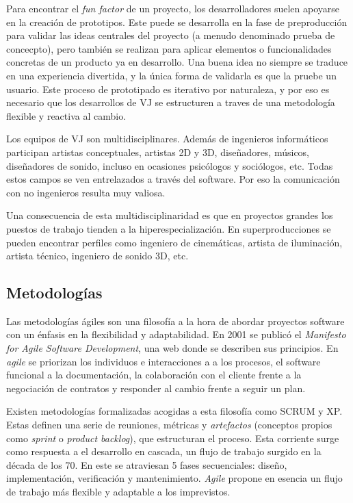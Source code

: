 Para encontrar el \textit{fun factor} de un proyecto, los desarrolladores suelen apoyarse en la creación de prototipos. Este puede se desarrolla en la fase de preproducción para validar las ideas centrales del proyecto (a menudo denominado prueba de concecpto), pero también se realizan para aplicar elementos o funcionalidades concretas de un producto ya en desarrollo. Una buena idea no siempre se traduce en una experiencia divertida, y la única forma de validarla es que la pruebe un usuario. Este proceso de prototipado es iterativo por naturaleza, y por eso es necesario que los desarrollos de VJ se estructuren a traves de una metodología flexible y reactiva al cambio. 

Los equipos de VJ son multidisciplinares. Además de ingenieros informáticos participan artistas conceptuales, artistas 2D y 3D, diseñadores, músicos, diseñadores de sonido, incluso en ocasiones psicólogos y sociólogos, etc. Todas estos campos se ven entrelazados a través del software. Por eso la comunicación con no ingenieros resulta muy valiosa.

Una consecuencia de esta multidisciplinaridad es que en proyectos grandes los puestos de trabajo tienden a la hiperespecialización. En superproducciones se pueden encontrar perfiles como ingeniero de cinemáticas, artista de iluminación, artista técnico, ingeniero de sonido 3D, etc.

\subsection{Metodologías}

Las metodologías ágiles son una filosofía a la hora de abordar proyectos software con un énfasis en la flexibilidad y adaptabilidad. En 2001 se publicó el \textit{Manifesto for Agile Software Development}, una web donde se describen sus principios. En \textit{agile} se priorizan los individuos e interacciones a a los procesos, el software funcional a la documentación, la colaboración con el cliente frente a la negociación de contratos y responder al cambio frente a seguir un plan. 

Existen metodologías formalizadas acogidas a esta filosofía como SCRUM y XP. Estas definen una serie de reuniones, métricas y \textit{artefactos} (conceptos propios como \textit{sprint} o \textit{product backlog}), que estructuran el proceso. Esta corriente surge como respuesta a el desarrollo en cascada\cite{waterfall}, un flujo de trabajo surgido en la década de los 70. En este se atraviesan 5 fases secuenciales: diseño, implementación, verificación y mantenimiento. \textit{Agile} propone en esencia un flujo de trabajo más flexible y adaptable a los imprevistos.



